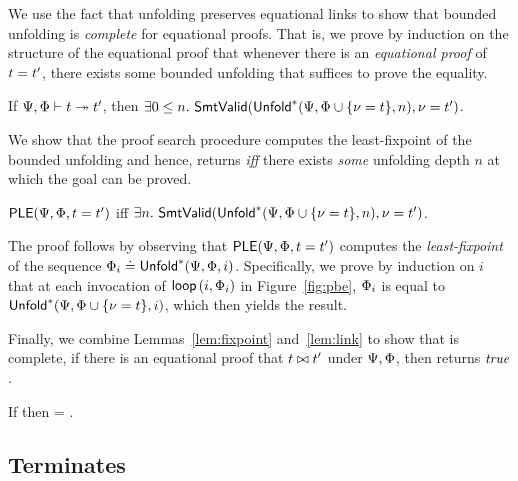 %
We use the fact that unfolding preserves
equational links to show that bounded unfolding
is \emph{complete} for equational proofs.
%
That is, we prove by induction on the structure
of the equational proof that whenever there is
an \emph{equational proof} of $t = t'$,
there exists some bounded unfolding that
suffices to prove the equality.

\begin{lemma}\label{lem:bounded-completeness}
  If   $\Psi, \Phi \vdash t \twoheadrightarrow t'$,
  then $\exists 0 \leq n.\ \smtIsValid{\binst{\Renv}{\extendpenv{\Penv}{\vv = \expr}}{n}}{\vv = \expr'}$.
\end{lemma}



%
We show that the proof search procedure \pbesym computes
the least-fixpoint of the bounded unfolding and hence,
returns \ttrue \textit{iff} there exists \emph{some} unfolding
depth $n$ at which the goal can be proved.

\begin{lemma}\label{lem:fixpoint}
$\mathsf{PLE}(\Psi,\Phi,t = t')$ iff
$\exists n.\ \smtIsValid{\binst{\Renv}{\extendpenv{\Penv}{\vv = \expr}}{n}}{\vv = \expr'}$.
\end{lemma}

The proof follows by observing that
$\mathsf{PLE}(\Psi,\Phi,t = t')$
computes the \emph{least-fixpoint}
of the sequence
%
$\Phi_i \doteq \mathsf{Unfold}^{*}(\Psi,\Phi,i) \label{eq:fix:1}$.
%
Specifically, we prove by induction on $i$
that at each invocation of $\mathsf{loop}\left(i, \Phi_i\right)$
in Figure~\ref{fig:pbe}, $\Phi_i$ is equal to
$\mathsf{Unfold}^{*}(\Psi,\Phi \cup \{ \nu = t \},i)$,
which then yields the result.

%
Finally, we combine Lemmas~\ref{lem:fixpoint}
and~\ref{lem:link} to show that
\pbesym is complete, \ie if there is an equational proof
that $t \bowtie t'$ under $\Psi, \Phi$,
then  returns $\mathit{true}$.

\begin{theorem} \label{thm:completeness}
  If 
  then  = \ttrue.
\end{theorem}

\subsection{\pbesym Terminates} \label{sec:pbe:terminates}


